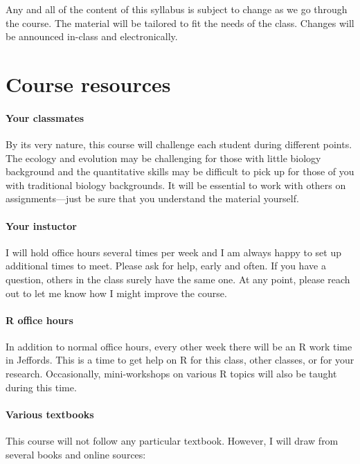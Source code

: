 \documentclass[12pt,]{article}
\let\oldparagraph\paragraph
\renewcommand{\paragraph}[1]{\oldparagraph{#1}\mbox{}}
\begin{document}
Any and all of the content of this syllabus is subject to change as we
go through the course. The material will be tailored to fit the needs of
the class. Changes will be announced in-class and electronically.

\section{Course resources}\label{course-resources}

\paragraph{Your classmates}\label{your-classmates}

By its very nature, this course will challenge each student during
different points. The ecology and evolution may be challenging for those
with little biology background and the quantitative skills may be
difficult to pick up for those of you with traditional biology
backgrounds. It will be essential to work with others on
assignments---just be sure that you understand the material yourself.

\paragraph{Your instuctor}\label{your-instuctor}

I will hold office hours several times per week and I am always happy to
set up additional times to meet. Please ask for help, early and often.
If you have a question, others in the class surely have the same one. At
any point, please reach out to let me know how I might improve the
course.

\paragraph{R office hours}\label{r-office-hours}

In addition to normal office hours, every other week there will be an R
work time in Jeffords. This is a time to get help on R for this class,
other classes, or for your research. Occasionally, mini-workshops on
various R topics will also be taught during this time.

\paragraph{Various textbooks}\label{various-textbooks}

This course will not follow any particular textbook. However, I will
draw from several books and online sources:
\end{document}
